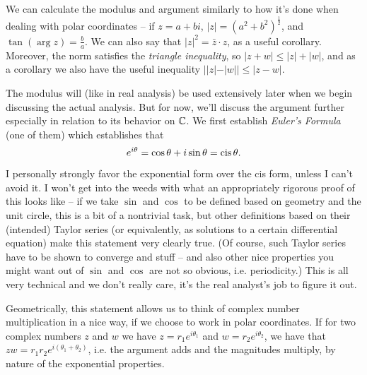 We can calculate the modulus and argument similarly to how it's done when dealing with polar coordinates -- if $z = a + bi$, $|z| = (a^2 + b^2)^{\frac 12}$, and $\tan(\arg z) = \frac b a$. We can also say that $|z|^2 = \bar z \cdot z$, as a useful corollary. Moreover, the norm satisfies the \textit{triangle inequality}, so $|z + w| \leq |z| + |w|$, and as a corollary we also have the useful inequality $||z| - |w||  \leq |z - w|$.

The modulus will (like in real analysis) be used extensively later when we begin discussing the actual analysis. But for now, we'll discuss the argument further especially in relation to its behavior on $\mathbb C$. We first establish \textit{Euler's Formula} (one of them) which establishes that
\[
    e^{i\theta} = \cos \theta + i \sin \theta = \operatorname{cis} \theta.
\]
I personally strongly favor the exponential form over the cis form, unless I can't avoid it. I won't get into the weeds with what an appropriately rigorous proof of this looks like -- if we take $\sin$ and $\cos$ to be defined based on geometry and the unit circle, this is a bit of a nontrivial task, but other definitions based on their (intended) Taylor series (or equivalently, as solutions to a certain differential equation) make this statement very clearly true. (Of course, such Taylor series have to be shown to converge and stuff -- and also other nice properties you might want out of $\sin$ and $\cos$ are not so obvious, i.e. periodicity.) This is all very technical and we don't really care, it's the real analyst's job to figure it out.


Geometrically, this statement allows us to think of complex number multiplication in a nice way, if we choose to work in polar coordinates. If for two complex numbers $z$ and $w$ we have $z = r_1 e^{i\theta_1}$ and $w = r_2 e^{i\theta_2}$, we have that $zw = r_1 r_2 e^{i (\theta_1 + \theta_2)}$, i.e. the argument adds and the magnitudes multiply, by nature of the exponential properties.

